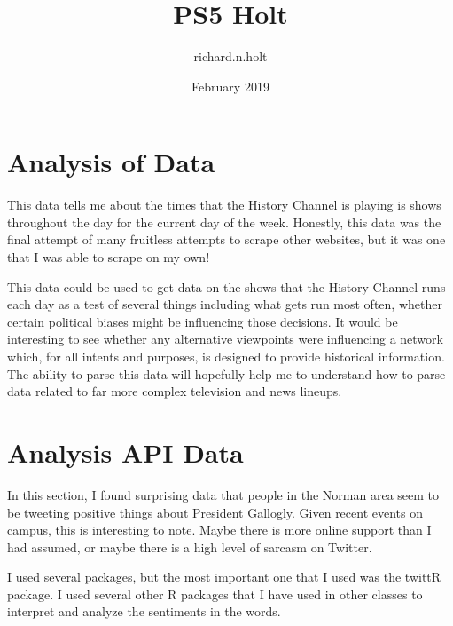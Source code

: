 \documentclass{article}
\title{PS5 Holt}
\author{richard.n.holt }
\date{February 2019}
\begin{document}
\maketitle

\section{Analysis of Data}
This data tells me about the times that the History Channel is playing is shows throughout the day for the current day of the week. Honestly, this data was the final attempt of many fruitless attempts to scrape other websites, but it was one that I was able to scrape on my own!

This data could be used to get data on the shows that the History Channel runs each day as a test of several things including what gets run most often, whether certain political biases might be influencing those decisions. It would be interesting to see whether any alternative viewpoints were influencing a network which, for all intents and purposes, is designed to provide historical information. The ability to parse this data will hopefully help me to understand how to parse data related to far more complex television and news lineups.

\section{Analysis API Data}
In this section, I found surprising data that people in the Norman area seem to be tweeting positive things about President Gallogly. Given recent events on campus, this is interesting to note. Maybe there is more online support than I had assumed, or maybe there is a high level of sarcasm on Twitter.

I used several packages, but the most important one that I used was the twittR package. I used several other R packages that I have used in other classes to interpret and analyze the sentiments in the words.
\end{document}
